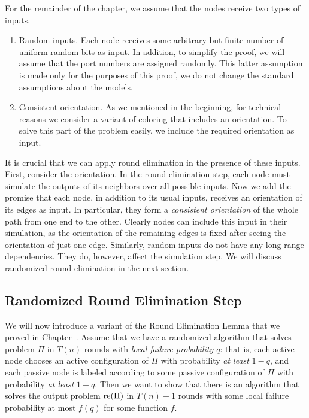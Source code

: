 For the remainder of the chapter, we assume that the nodes receive two types of inputs.
\begin{enumerate}
	\item Random inputs. Each node receives some arbitrary but finite number of uniform random bits as input. In addition, to simplify the proof, we will assume that the port numbers are assigned randomly. This latter assumption is made only for the purposes of this proof, we do not change the standard assumptions about the models.
	\item Consistent orientation. As we mentioned in the beginning, for technical reasons we consider a variant of coloring that includes an orientation. To solve this part of the problem easily, we include the required orientation as input.
\end{enumerate}
It is crucial that we can apply round elimination in the presence of these inputs. First, consider the orientation. In the round elimination step, each node must simulate the outputs of its neighbors over all possible inputs. Now we add the promise that each node, in addition to its usual inputs, receives an orientation of its edges as input. In particular, they form a \emph{consistent orientation} of the whole path from one end to the other. Clearly nodes can include this input in their simulation, as the orientation of the remaining edges is fixed after seeing the orientation of just one edge. Similarly, random inputs do not have any long-range dependencies. They do, however, affect the simulation step. We will discuss randomized round elimination in the next section.

\subsection{Randomized Round Elimination Step} \label{ssec:rand-re}

We will now introduce a variant of the Round Elimination Lemma that we proved in Chapter~. Assume that we have a randomized algorithm that solves problem $\Pi$ in $T(n)$ rounds with \emph{local failure probability $q$}: that is, each active node chooses an active configuration of $\Pi$ with probability \emph{at least} $1-q$, and each passive node is labeled according to some passive configuration of $\Pi$ with probability \emph{at least} $1-q$. Then we want to show that there is an algorithm that solves the output problem $\operatorname{re}(\Pi)$ in $T(n)-1$ rounds with some local failure probability at most $f(q)$ for some function $f$.

